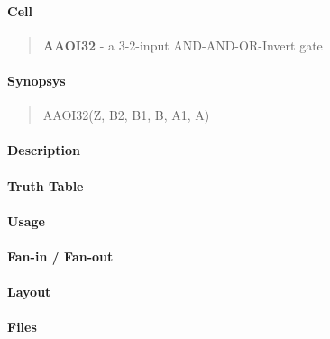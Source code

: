 \label{AAOI32}
\paragraph{Cell}
\begin{quote}
    \textbf{AAOI32} - a 3-2-input AND-AND-OR-Invert gate
\end{quote}

\paragraph{Synopsys}
\begin{quote}
    AAOI32(Z, B2, B1, B, A1, A)
\end{quote}

\paragraph{Description}

%

\paragraph{Truth Table}
%

\paragraph{Usage}

\paragraph{Fan-in / Fan-out}

\paragraph{Layout}

\paragraph{Files}
